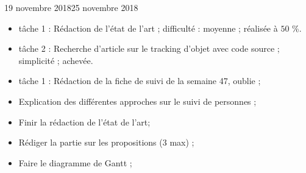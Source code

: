 \documentclass[12pt]{fiche-rd-info}
\begin{document}

\begin{fichesuivi}{19 novembre 2018}{25 novembre 2018}

	\begin{travaileffectue}
		\begin{itemize}
			\item tâche 1 : Rédaction de l'état de l'art ; difficulté : moyenne ; réalisée à  $50$ \%.
			\item tâche 2 : Recherche d'article sur le tracking d'objet avec code source ; simplicité ; achevée.
		\end{itemize}
	\end{travaileffectue}

	\begin{travailnoneffectue}
		\begin{itemize}
				\item tâche 1 : Rédaction de la fiche de suivi de la semaine 47, oublie ;
		\end{itemize}
	\end{travailnoneffectue}

	\begin{echange}
		\begin{itemize}
			\item Explication des différentes approches sur le suivi de personnes ;
		\end{itemize}
	\end{echange}

	\begin{planification}
		\begin{itemize}
			\item Finir la rédaction de l'état de l'art;
			\item Rédiger la partie sur les propositions (3 max) ;
			\item Faire le diagramme de Gantt ;
		\end{itemize}
	\end{planification}
\end{fichesuivi}
\end{document}
